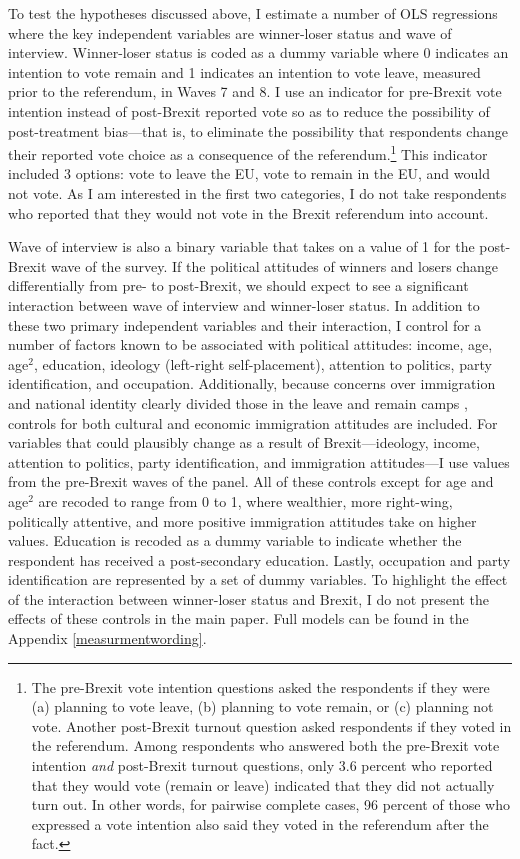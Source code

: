 \documentclass[12pt, letter]{article}
\begin{document}
To test the hypotheses discussed above, I estimate a number of OLS regressions where the key independent variables are winner-loser status and wave of interview. Winner-loser status is coded as a dummy variable where 0 indicates an intention to vote remain and 1 indicates an intention to vote leave, measured prior to the referendum, in Waves 7 and 8. I use an indicator for pre-Brexit vote intention instead of post-Brexit reported vote so as to reduce the possibility of post-treatment bias---that is, to eliminate the possibility that respondents change their reported vote choice as a consequence of the referendum.\footnote{The pre-Brexit vote intention questions asked the respondents if they were (a) planning to vote leave, (b) planning to vote remain, or (c) planning not vote. Another post-Brexit turnout question asked respondents if they voted in the referendum. Among respondents who answered both the pre-Brexit vote intention \textit{and} post-Brexit turnout questions, only 3.6 percent who reported that they would vote (remain or leave) indicated that they did not actually turn out. In other words, for pairwise complete cases, 96 percent of those who expressed a vote intention also said they voted in the referendum after the fact.} This indicator included 3 options: vote to leave the EU, vote to remain in the EU, and would not vote. As I am interested in the first two categories, I do not take respondents who reported that they would not vote in the Brexit referendum into account.

Wave of interview is also a binary variable that takes on a value of 1 for the post-Brexit wave of the survey. If the political attitudes of winners and losers change differentially from pre- to post-Brexit, we should expect to see a significant interaction between wave of interview and winner-loser status. In addition to these two primary independent variables and their interaction, I control for a number of factors known to be associated with political attitudes: income, age, age$^2$, education, ideology (left-right self-placement), attention to politics, party identification, and occupation. Additionally, because concerns over immigration and national identity clearly divided those in the leave and remain camps \parencite{hobolt2016brexit}, controls for both cultural and economic immigration attitudes are included. For variables that could plausibly change as a result of Brexit---ideology, income, attention to politics, party identification, and immigration attitudes---I use values from the pre-Brexit waves of the panel. All of these controls except for age and age$^2$ are recoded to range from 0 to 1, where wealthier, more right-wing, politically attentive, and more positive immigration attitudes take on higher values. Education is recoded as a dummy variable to indicate whether the respondent has received a post-secondary education. Lastly, occupation and party identification are represented by a set of dummy variables. To highlight the effect of the interaction between winner-loser status and Brexit, I do not present the effects of these controls in the main paper. Full models can be found in the Appendix \ref{measurmentwording}.
\end{document}
